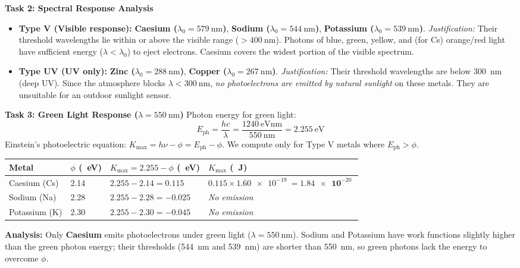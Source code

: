 \documentclass[11pt]{article}
\begin{document}
\textbf{Task 2: Spectral Response Analysis}
\begin{itemize}
    \item \textbf{Type V (Visible response):} \textbf{Caesium ($\lambda_0 = \SI{579}{\nano\meter}$)}, \textbf{Sodium ($\lambda_0 = \SI{544}{\nano\meter}$)}, \textbf{Potassium ($\lambda_0 = \SI{539}{\nano\meter}$)}.
    \emph{Justification:} Their threshold wavelengths lie within or above the visible range ($> \SI{400}{\nano\meter}$). Photons of blue, green, yellow, and (for Cs) orange/red light have sufficient energy ($\lambda < \lambda_0$) to eject electrons. Caesium covers the widest portion of the visible spectrum.
    \item \textbf{Type UV (UV only):} \textbf{Zinc ($\lambda_0 = \SI{288}{\nano\meter}$)}, \textbf{Copper ($\lambda_0 = \SI{267}{\nano\meter}$)}.
    \emph{Justification:} Their threshold wavelengths are below \SI{300}{\nano\meter} (deep UV). Since the atmosphere blocks $\lambda < \SI{300}{\nano\meter}$, \emph{no photoelectrons are emitted by natural sunlight} on these metals. They are unsuitable for an outdoor sunlight sensor.
\end{itemize}

\textbf{Task 3: Green Light Response ($\lambda = \SI{550}{\nano\meter}$)}
Photon energy for green light:
\[
E_{\text{ph}} = \frac{hc}{\lambda} = \frac{\SI{1240}{\electronvolt\nano\meter}}{\SI{550}{\nano\meter}} = \SI{2.255}{\electronvolt}
\]
Einstein's photoelectric equation: $K_{\text{max}} = h\nu - \phi = E_{\text{ph}} - \phi$. We compute only for Type V metals where $E_{\text{ph}} > \phi$.

\begin{center}
\begin{tabularx}{\linewidth}{|l|X|X|X|}\hline
\rowcolor{popblueL}
\textbf{Metal} & \textbf{$\phi$ (\SI{}{\electronvolt})} & \textbf{$K_{\text{max}} = 2.255 - \phi$ (\SI{}{\electronvolt})} & \textbf{$K_{\text{max}}$ (\SI{}{\joule})} \\ \hline
Caesium (Cs) & 2.14 & $2.255 - 2.14 = \mathbf{0.115}$ & $0.115 \times \SI{1.60e-19}{} = \mathbf{\SI{1.84e-20}{}}$ \\ \hline
Sodium (Na) & 2.28 & $2.255 - 2.28 = -0.025$ & \emph{No emission} \\ \hline
Potassium (K) & 2.30 & $2.255 - 2.30 = -0.045$ & \emph{No emission} \\ \hline
\end{tabularx}
\end{center}

\textbf{Analysis:} Only \textbf{Caesium} emits photoelectrons under green light ($\lambda = \SI{550}{\nano\meter}$). Sodium and Potassium have work functions slightly higher than the green photon energy; their thresholds (\SI{544}{\nano\meter} and \SI{539}{\nano\meter}) are shorter than \SI{550}{\nano\meter}, so green photons lack the energy to overcome $\phi$.
\end{document}
